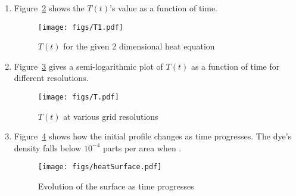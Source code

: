 \documentclass[12pt,a4]{article}
\begin{document}
\begin{enumerate}
\begin{enumerate}
\begin{align*}
          \Rightarrow &  \frac{d^2 f(x_0)}{dx^2} = \frac{3}{h} \frac{d f(x_0)}{dx} + \frac{- 7 f(x_0) + 8 f(x_0 - h) - f(x_0 - 2h)}{2 h^2} + \mathscr{O} (h^2)
        \end{align*}
        Figure~\ref{fig:secondOrder} shows this second-order method being used to solve a one-dimensional dispersion problem.
        \begin{figure}[H]
          \centering
          \texttt{[image: figs/secondOrder.pdf]}
          \caption{Second order Neuman end points}
          \label{fig:secondOrder}
        \end{figure}
        
        The rest of this question uses the first-order method described above and an RK4 integrator.
      \item
        Figure~\ref{fig:T1} shows the $T(t)$'s value as a function of time.
        \begin{figure}[H]
          \centering
          \texttt{[image: figs/T1.pdf]}
          \caption{$T(t)$ for the given 2 dimensional heat equation}
          \label{fig:T1}
        \end{figure}

      \item
        Figure~\ref{fig:T} gives a semi-logarithmic plot of $T(t)$ as a function of time for different resolutions.
        \begin{figure}[H]
          \centering
          \texttt{[image: figs/T.pdf]}
          \caption{$T(t)$ at various grid resolutions}
          \label{fig:T}
        \end{figure}
      \item
        Figure~\ref{fig:heatSurface} shows how the initial profile changes as time progresses.
        The dye's density falls below $10^{-4}$ parts per area when .

        \begin{figure}[H]
          \centering
          \texttt{[image: figs/heatSurface.pdf]}
          \caption{Evolution of the surface as time progresses}
          \label{fig:heatSurface}
        \end{figure}
    \end{enumerate}


\end{enumerate}
\end{document}
